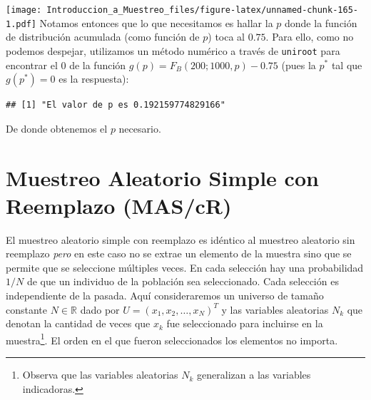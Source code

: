 \documentclass[
]{book}
\newenvironment{Shaded}{\begin{snugshade}}{\end{snugshade}}
\newcommand{\AttributeTok}[1]{\textcolor[rgb]{0.77,0.63,0.00}{#1}}
\newcommand{\ControlFlowTok}[1]{\textcolor[rgb]{0.13,0.29,0.53}{\textbf{#1}}}
\newcommand{\DecValTok}[1]{\textcolor[rgb]{0.00,0.00,0.81}{#1}}
\newcommand{\FloatTok}[1]{\textcolor[rgb]{0.00,0.00,0.81}{#1}}
\newcommand{\FunctionTok}[1]{\textcolor[rgb]{0.00,0.00,0.00}{#1}}
\newcommand{\NormalTok}[1]{#1}
\newcommand{\OtherTok}[1]{\textcolor[rgb]{0.56,0.35,0.01}{#1}}
\newcommand{\SpecialCharTok}[1]{\textcolor[rgb]{0.00,0.00,0.00}{#1}}
\newcommand{\StringTok}[1]{\textcolor[rgb]{0.31,0.60,0.02}{#1}}
\begin{document}
\texttt{[image: Introduccion\_a\_Muestreo\_files/figure-latex/unnamed-chunk-165-1.pdf]}
Notamos entonces que lo que necesitamos es hallar la \(p\) donde la función de distribución acumulada (como función de \(p\)) toca al \(0.75\). Para ello, como no podemos despejar, utilizamos un método numérico a través de \texttt{uniroot} para encontrar el \(0\) de la función \(g(p) = F_B(200; 1000, p) - 0.75\) (pues la \(p^*\) tal que \(g(p^*)=0\) es la respuesta):

\begin{Shaded}
\end{Shaded}

\begin{verbatim}
## [1] "El valor de p es 0.192159774829166"
\end{verbatim}

De donde obtenemos el \(p\) necesario.

\hypertarget{muestreo-aleatorio-simple-con-reemplazo-mascr}{%
\section{Muestreo Aleatorio Simple con Reemplazo (MAS/cR)}\label{muestreo-aleatorio-simple-con-reemplazo-mascr}}

El muestreo aleatorio simple con reemplazo es idéntico al muestreo aleatorio sin reemplazo \emph{pero} en este caso no se extrae un elemento de la muestra sino que se permite que se seleccione múltiples veces. En cada selección hay una probabilidad \(1/N\) de que un individuo de la población sea seleccionado. Cada selección es independiente de la pasada. Aquí consideraremos un universo de tamaño constante \(N\in\mathbb{R}\) dado por \(U =(x_1, x_2, \dots, x_N)^T\) y las variables aleatorias \(N_k\) que denotan la cantidad de veces que \(x_k\) fue seleccionado para incluirse en la muestra\footnote{Observa que las variables aleatorias \(N_k\) generalizan a las variables indicadoras.}. El orden en el que fueron seleccionados los elementos no importa.
\end{document}

